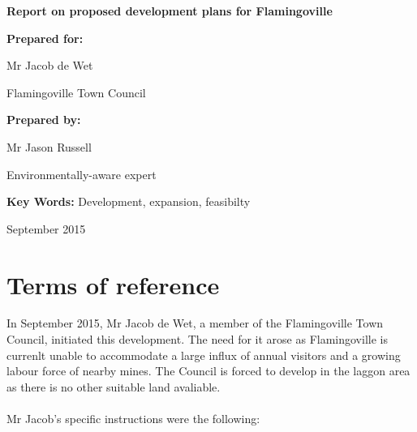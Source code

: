 \documentclass{article}
\begin{document}
\begin{titlepage}
	\begin{center}
		\vspace*{1cm}
		
		\textbf{Report on proposed development plans for Flamingoville}
		
		\vspace{1.5cm}
		
		\textbf{Prepared for:}
		
		Mr Jacob de Wet
		
		Flamingoville Town Council
		
		\vspace{1.5cm}
		
		\textbf{Prepared by:}
		
		Mr Jason Russell
		
		Environmentally-aware expert
		
		\vspace{1.5cm}

		\textbf{Key Words:}
		Development, expansion, feasibilty
		
		\vspace{1.5cm}
		September 2015
		
	\end{center}
\end{titlepage}
\thispagestyle{empty}

\setcounter{page}{0}

\newpage
\section*{Terms of reference}
In September 2015, Mr Jacob de Wet, a member of the Flamingoville Town Council, initiated this development. The need for it arose as Flamingoville is currenlt unable to accommodate a large influx of annual visitors and a growing labour force of nearby mines. The Council is forced to develop in the laggon area as there is no other suitable land avaliable.

\paragraph{}

Mr Jacob's specific instructions were the following:
\end{document}
